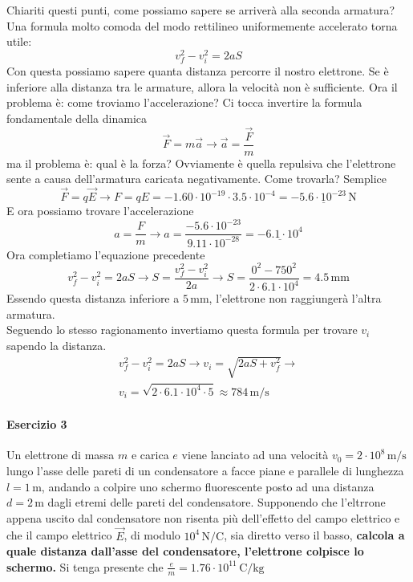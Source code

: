 Chiariti questi punti, come possiamo sapere se arriverà alla seconda armatura? Una formula molto 
comoda del modo rettilineo uniformemente accelerato torna utile:
\begin{equation*}
  v_f^2 - v_i^2 = 2aS
\end{equation*}
Con questa possiamo sapere quanta distanza percorre il nostro elettrone. Se è inferiore alla distanza
tra le armature, allora la velocità non è sufficiente. Ora il problema è: come troviamo 
l'accelerazione? Ci tocca invertire la formula fondamentale della dinamica
\begin{equation*}
  \vec{F} = m\vec{a} \rightarrow \vec{a} = \frac{\vec{F}}{m}
\end{equation*}
ma il problema è: qual è la forza? Ovviamente è quella repulsiva che l'elettrone sente a causa 
dell'armatura caricata negativamente. Come trovarla? Semplice
\begin{equation*}
  \vec{F} = q\vec{E} \rightarrow F = qE = -1.60\cdot10^{-19}\cdot3.5\cdot10^{-4} = 
  \underline{-5.6\cdot10^{-23}\,\text{N}}
\end{equation*}
E ora possiamo trovare l'accelerazione
\begin{equation*}
  a = \frac{F}{m} \rightarrow a = \frac{-5.6\cdot10^{-23}}{9.11\cdot10^{-28}} = 
  \underline{-6.1\cdot10^4}
\end{equation*}
Ora completiamo l'equazione precedente
\begin{equation*}
  v_f^2 - v_i^2 = 2aS \rightarrow S = \frac{v_f^2 - v_i^2}{2a} \rightarrow 
  S = \frac{0^2 - 750^2}{2\cdot6.1\cdot10^4} = \boxed{4.5\,\text{mm}}
\end{equation*}
Essendo questa distanza inferiore a $5\,\text{mm}$, l'elettrone non raggiungerà l'altra armatura.\\
Seguendo lo stesso ragionamento invertiamo questa formula per trovare $v_i$ sapendo la distanza.
\begin{align*}
  v_f^2 - v_i^2 = 2aS \rightarrow v_i = \sqrt{2aS + v_f^2} \rightarrow \\
  v_i = \sqrt{2\cdot6.1\cdot10^4\cdot5} \approx \boxed{784\,\text{m/s}}
\end{align*}

\paragraph{Esercizio 3}
Un elettrone di massa $m$ e carica $e$ viene lanciato ad una velocità $v_0=2\cdot10^8\,\text{m/s}$
lungo l'asse delle pareti di un condensatore a facce piane e parallele di lunghezza $l=1\,\text{m}
$, andando a colpire uno schermo fluorescente posto ad una distanza $d=2\,\text{m}$ dagli etremi 
delle pareti del condensatore. Supponendo che l'eltrrone appena uscito dal condensatore non
risenta più dell'effetto del campo elettrico e che il campo elettrico $\vec{E}$, di modulo
$10^4\,\text{N/C}$, sia diretto verso il basso, \textbf{calcola a quale distanza dall'asse del
condensatore, l'elettrone colpisce lo schermo.} Si tenga presente che 
$\frac{e}{m}=1.76\cdot10^{11}\,\text{C/kg}$
\divisor

